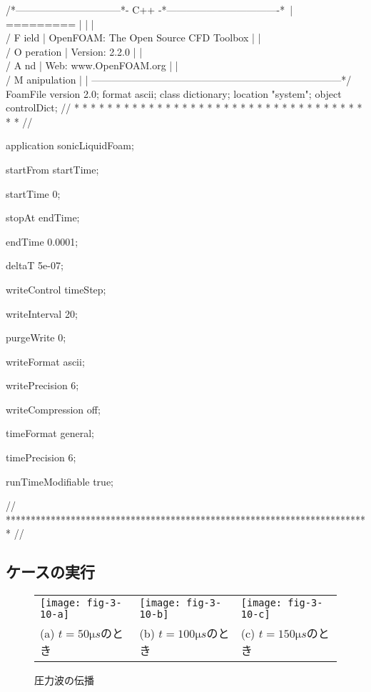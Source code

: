 \begin{OFverbatim}
/*--------------------------------*- C++ -*----------------------------------*\
| =========                 |                                                 |
| \\      /  F ield         | OpenFOAM: The Open Source CFD Toolbox           |
|  \\    /   O peration     | Version:  2.2.0                                 |
|   \\  /    A nd           | Web:      www.OpenFOAM.org                      |
|    \\/     M anipulation  |                                                 |
\*---------------------------------------------------------------------------*/
FoamFile
{
    version     2.0;
    format      ascii;
    class       dictionary;
    location    "system";
    object      controlDict;
}
// * * * * * * * * * * * * * * * * * * * * * * * * * * * * * * * * * * * * * //

application     sonicLiquidFoam;

startFrom       startTime;

startTime       0;

stopAt          endTime;

endTime         0.0001;

deltaT          5e-07;

writeControl    timeStep;

writeInterval   20;

purgeWrite      0;

writeFormat     ascii;

writePrecision  6;

writeCompression off;

timeFormat      general;

timePrecision   6;

runTimeModifiable true;


// ************************************************************************* //
\end{OFverbatim}


\subsection{ケースの実行}
\label{ssec:3.4.4}


\begin{figure}[ht]
 \tabcolsep=1pt
 \begin{tabular}{lll}
  \texttt{[image: fig-3-10-a]} &
  \texttt{[image: fig-3-10-b]} &
  \texttt{[image: fig-3-10-c]} \\
  (a) $t =  50 \unit{\micro s}$のとき &
  (b) $t = 100 \unit{\micro s}$のとき &
  (c) $t = 150 \unit{\micro s}$のとき
 \end{tabular}
 \caption{圧力波の伝播}
 \label{fig:3.10}
\end{figure}


